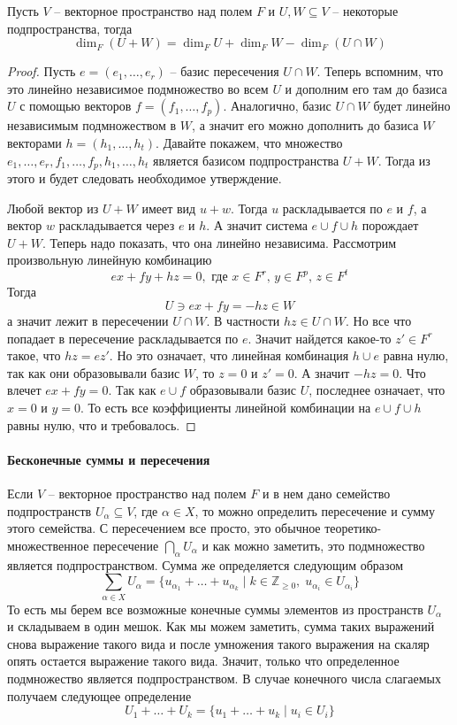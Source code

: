 \begin{claim}
Пусть $V$ -- векторное пространство над полем $F$ и $U,W\subseteq V$ -- некоторые подпространства, тогда 
\[
\dim_F (U + W) = \dim_F U + \dim_F W - \dim_F (U\cap W)
\]
\end{claim}
\begin{proof}
Пусть $e=(e_1,\ldots,e_r)$ -- базис пересечения $U\cap W$.
Теперь вспомним, что это линейно независимое подмножество во всем $U$ и дополним его там до базиса $U$ с помощью векторов $f=(f_1,\ldots, f_p)$.
Аналогично, базис $U\cap W$ будет линейно независимым подмножеством в $W$, а значит его можно дополнить до базиса $W$ векторами $h=(h_1,\ldots,h_t)$.
Давайте покажем, что множество $e_1,\ldots,e_r, f_1,\ldots,f_p,h_1,\ldots,h_t$ является базисом подпространства $U + W$.
Тогда из этого и будет следовать необходимое утверждение.

Любой вектор из $U+W$ имеет вид $u+w$.
Тогда $u$ раскладывается по $e$ и $f$, а вектор $w$ раскладывается через $e$ и $h$.
А значит система $e\cup f\cup h$ порождает $U + W$.
Теперь надо показать, что она линейно независима.
Рассмотрим произвольную линейную комбинацию
\[
e x + fy + hz = 0, \text{ где }x\in F^r,\, y\in F^p,\, z\in F^t
\]
Тогда
\[
U \ni ex +fy = -hz \in W
\]
а значит лежит в пересечении $U\cap W$.
В частности $hz \in U\cap W$.
Но все что попадает в пересечение раскладывается по $e$.
Значит найдется какое-то $z'\in F^r$ такое, что $hz = ez'$.
Но это означает, что линейная комбинация $h\cup e$ равна нулю, так как они образовывали базис $W$, то $z =0$ и $z' = 0$.
А значит $-hz = 0$.
Что влечет $ex + fy = 0$.
Так как $e \cup f$ образовывали базис $U$, последнее означает, что $x = 0$ и $y = 0$.
То есть все коэффициенты линейной комбинации на $e\cup f\cup h$ равны нулю, что и требовалось.
\end{proof}

\paragraph{Бесконечные суммы и пересечения}

Если $V$ -- векторное пространство над полем $F$ и в нем дано семейство подпространств $U_\alpha \subseteq V$, где $\alpha\in X$, то можно определить пересечение и сумму этого семейства.
С пересечением все просто, это обычное теоретико-множественное пересечение $\bigcap_{\alpha} U_\alpha$ и как можно заметить, это подмножество является подпространством.
Сумма же определяется следующим образом
\[
\sum_{\alpha \in X} U_\alpha = \{u_{\alpha_1}+\ldots+u_{\alpha_k} \mid k\in\mathbb Z_{\geqslant 0},\; u_{\alpha_i}\in U_{\alpha_i}\}
\]
То есть мы берем все возможные конечные суммы элементов из пространств $U_\alpha$ и складываем в один мешок.
Как мы можем заметить, сумма таких выражений снова выражение такого вида и после умножения такого выражения на скаляр опять остается выражение такого вида.
Значит, только что определенное подмножество является подпространством.
В случае конечного числа слагаемых получаем следующее определение
\[
U_1 + \ldots + U_k = \{u_1 + \ldots + u_k \mid u_i\in U_i\}
\]

